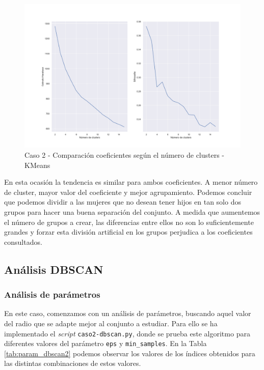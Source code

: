 \documentclass[a4paper, 20pt]{article}
\begin{document}
\begin{figure}[H]
    \centering
    \includegraphics[width=1.2\textwidth, height=0.45\textheight]{./caso2/param_kmeans}
    \caption{Caso 2 - Comparación coeficientes según el número de clusters - KMeans}
    \label{fig:param_kmeans2}
\end{figure}

En esta ocasión la tendencia es similar para ambos coeficientes. A menor número de cluster, mayor valor del coeficiente y mejor agrupamiento. Podemos concluir que podemos dividir a las mujeres que no desean tener hijos en tan solo dos grupos para hacer una buena separación del conjunto. A medida que aumentemos el número de grupos a crear, las diferencias entre ellos no son lo suficientemente grandes y forzar esta división artificial en los grupos perjudica a los coeficientes consultados.

\subsection{Análisis DBSCAN}
\subsubsection{Análisis de parámetros}
En este caso, comenzamos con un análisis de parámetros, buscando aquel valor del radio que se adapte mejor al conjunto a estudiar. Para ello se ha implementado el \textit{script} \texttt{caso2-dbscan.py}, donde se prueba este algoritmo para diferentes valores del parámetro \texttt{eps} y \texttt{min\_samples}. En la Tabla \ref{tab:param_dbscan2} podemos observar los valores de los índices obtenidos para las distintas combinaciones de estos valores.
\end{document}
